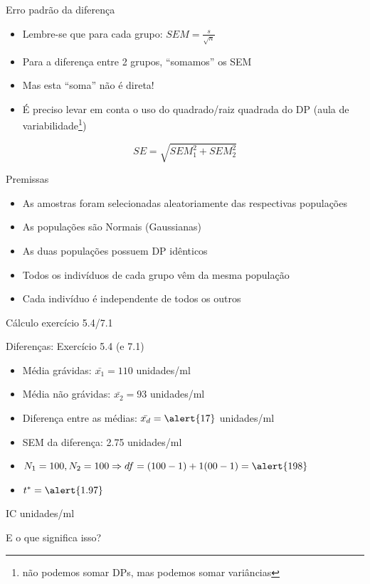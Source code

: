 \documentclass{beamer}
\begin{document}
\begin{frame}{Erro padrão da diferença}
  \begin{itemize}
  \item Lembre-se que para cada grupo: $SEM = \frac{s}{\sqrt{n}}$
  \item Para a diferença entre 2 grupos, ``somamos'' os SEM
  \item Mas esta ``soma'' não é direta!
  \item É preciso levar em conta o uso do quadrado/raiz quadrada do DP (aula de variabilidade\footnote{não podemos somar DPs, mas podemos somar variâncias})
  \end{itemize}
  \begin{block}{}
      \begin{displaymath}
    SE = \sqrt{SEM_1^2 + SEM_2^2}
  \end{displaymath}
  \end{block}
\end{frame}

\begin{frame}{Premissas}
  \begin{itemize}
  \item As amostras foram selecionadas aleatoriamente das respectivas populações
  \item As populações são Normais (Gaussianas)
  \item As duas populações possuem DP idênticos
  \item Todos os indivíduos de cada grupo vêm da mesma população
  \item Cada indivíduo é independente de todos os outros
  \end{itemize}
\end{frame}


\begin{frame}{Cálculo exercício 5.4/7.1}
  \begin{exampleblock}{Diferenças: Exercício 5.4 (e 7.1)}
    \begin{itemize}
    \item Média grávidas: $\bar{x_1} = 110$ unidades/ml
    \item Média não grávidas: $\bar{x_2} = 93$ unidades/ml
    \item Diferença entre as médias: $\bar{x_d} = \alert{17}$ unidades/ml
    \item SEM da diferença: \alert{2.75} unidades/ml
    \item $N_1=100, N_2=100 \Rightarrow df = (100 -1) + 1(00 - 1) = \alert{198}$
    \item $t^{*} = \alert{1.97}$
    \end{itemize}
  \end{exampleblock}
  \begin{exampleblock}{IC}
    \centering
    [11.6, 22.4] unidades/ml
  \end{exampleblock}
  E o que significa isso?
\end{frame}
\end{document}
